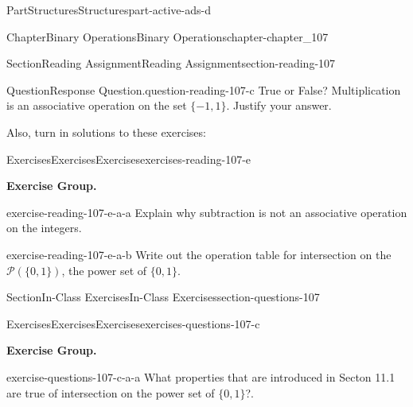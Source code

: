 \documentclass[oneside,10pt,]{book}
\numberwithin{equation}{section}
\begin{document}
\begin{partptx}{Part}{Structures}{}{Structures}{}{}{part-active-ads-d}
\begin{chapterptx}{Chapter}{Binary Operations}{}{Binary Operations}{}{}{chapter-chapter_107}
\begin{sectionptx}{Section}{Reading Assignment}{}{Reading Assignment}{}{}{section-reading-107}
\begin{question}{Question}{Response Question.}{question-reading-107-c}%
True or False?  Multiplication is an associative operation on the set \(\{-1,1\}\).  Justify your answer.%
\end{question}
Also, turn in solutions to these exercises:%
%
%
\typeout{************************************************}
\typeout{************************************************}
%
\begin{exercises-subsection-numberless}{Exercises}{Exercises}{}{Exercises}{}{}{exercises-reading-107-e}
\par\medskip\noindent%
\textbf{Exercise Group.}\space\space%
\begin{exercisegroup}
\begin{divisionexerciseeg}{1}{}{}{exercise-reading-107-e-a-a}%
Explain why subtraction is not an associative operation on the integers.%
\end{divisionexerciseeg}%
\begin{divisionexerciseeg}{2}{}{}{exercise-reading-107-e-a-b}%
Write out the operation table for intersection on the \(\mathcal{P}(\{0,1\})\), the power set of \(\{0,1\}\).%
\end{divisionexerciseeg}%
\end{exercisegroup}
\par\medskip\noindent
\end{exercises-subsection-numberless}
\end{sectionptx}
%
%
\typeout{************************************************}
\typeout{************************************************}
%
\begin{sectionptx}{Section}{In-Class Exercises}{}{In-Class Exercises}{}{}{section-questions-107}
%
%
%
\typeout{************************************************}
\typeout{************************************************}
%
\begin{exercises-subsection-numberless}{Exercises}{Exercises}{}{Exercises}{}{}{exercises-questions-107-c}
\par\medskip\noindent%
\textbf{Exercise Group.}\space\space%
\begin{exercisegroup}
\begin{divisionexerciseeg}{1}{}{}{exercise-questions-107-c-a-a}%
What properties that are introduced in Secton 11.1 are true of intersection on the power set of \(\{0,1\}\)?.%
\end{divisionexerciseeg}%

\end{exercisegroup}
\end{exercises-subsection-numberless}
\end{sectionptx}
\end{chapterptx}
\end{partptx}
\end{document}
